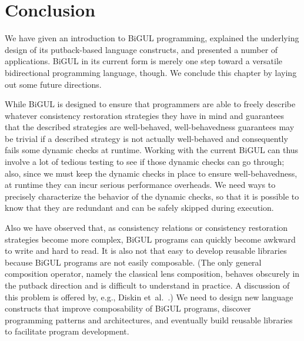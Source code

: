 
\section{Conclusion}

We have given an introduction to BiGUL programming, explained the underlying design of its putback-based language constructs, and presented a number of applications.
BiGUL in its current form is merely one step toward a versatile bidirectional programming language, though.
We conclude this chapter by laying out some future directions.

While BiGUL is designed to ensure that programmers are able to freely describe whatever consistency restoration strategies they have in mind and guarantees that the described strategies are well-behaved,
well-behavedness guarantees may be trivial if a described strategy is not actually well-behaved and consequently fails some dynamic checks at runtime.
Working with the current BiGUL can thus involve a lot of tedious testing to see if those dynamic checks can go through; also, since we must keep the dynamic checks in place to ensure well-behavedness, at runtime they can incur serious performance overheads.
We need ways to precisely characterize the behavior of the dynamic checks, so that it is possible to know that they are redundant and can be safely skipped during execution.

Also we have observed that, as consistency relations or consistency restoration strategies become more complex, BiGUL programs can quickly become awkward to write and hard to read.
It is also not that easy to develop reusable libraries because BiGUL programs are not easily composable.
(The only general composition operator, namely the classical lens composition, behaves obscurely in the putback direction and is difficult to understand in practice.
A discussion of this problem is offered by, e.g., Diskin et~al.~\cite[Section~2.2]{Diskin-delta-asymmetric}.)
We need to design new language constructs that improve composability of BiGUL programs, discover programming patterns and architectures, and eventually build reusable libraries to facilitate program development.

